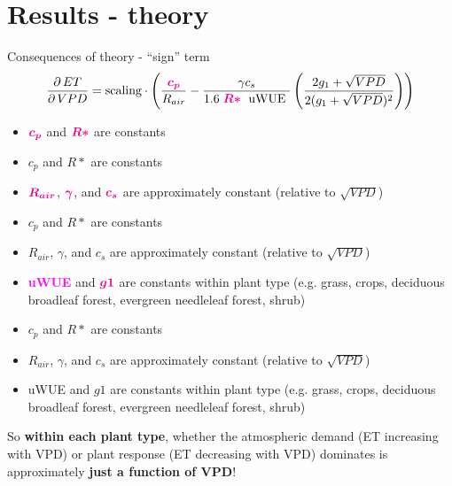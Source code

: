 \documentclass[aspectratio=169]{beamer}
\begin{document}
\section{Results - theory}
\begin{frame}{Consequences of theory - ``sign'' term}
  \[\frac{\partial \, ET}{\partial \, VPD} = \text{scaling} \cdot \left(\frac{\textcolor{magenta}{\boldsymbol{ c_p}}}{R_{air}} - \frac{\gamma c_s }{1.6 \; \textcolor{magenta}{\boldsymbol{R*}}\; \text{ uWUE }} \left( \frac{2 g_1 + \sqrt{VPD}}{2 (g_1 + \sqrt{VPD})^2}\right) \right)\]
  \begin{overprint}
    \begin{itemize}
    \item $\textcolor{magenta}{\boldsymbol{c_p}}$ and $\textcolor{magenta}{\boldsymbol{R*}}$ are constants
    \end{itemize}
    \begin{itemize}
    \item $c_p$ and $R*$ are constants
    \item $\textcolor{magenta}{\boldsymbol{R_{air}}}$, $\textcolor{magenta}{\boldsymbol{\gamma}}$, and $\textcolor{magenta}{\boldsymbol{c_s}}$ are approximately constant (relative to $\sqrt{VPD}$)
    \end{itemize}
    \begin{itemize}
    \item $c_p$ and $R*$ are constants
    \item $R_{air}$, $\gamma$, and $c_s$ are approximately constant (relative to $\sqrt{VPD}$)
    \item \textcolor{magenta}{\textbf{uWUE}} and $\textcolor{magenta}{\boldsymbol{g1}}$ are constants within plant type (e.g. grass, crops, deciduous broadleaf forest, evergreen needleleaf forest, shrub)
    \end{itemize}
    \begin{itemize}
    \item $c_p$ and $R*$ are constants
    \item $R_{air}$, $\gamma$, and $c_s$ are approximately constant (relative to $\sqrt{VPD}$)
    \item uWUE and $g1$ are constants within plant type (e.g. grass, crops, deciduous broadleaf forest, evergreen needleleaf forest, shrub)
    \end{itemize}
    So \textbf{within each plant type}, whether the atmospheric demand (ET increasing with VPD) or plant response (ET decreasing with VPD) dominates is approximately \textbf{just a function of VPD}!
  \end{overprint}    
\end{frame}
\end{document}
